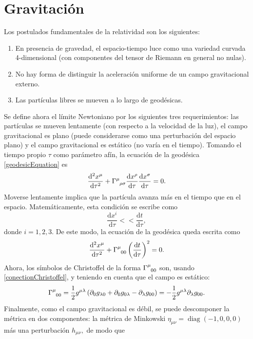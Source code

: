 \section{Gravitación}
Los postulados fundamentales de la relatividad son los siguientes:
	\begin{enumerate}
		\item En presencia de gravedad, el espacio-tiempo luce como una variedad curvada 4-dimensional (con componentes del tensor de Riemann en general no nulas).
		\item No hay forma de distinguir la aceleración uniforme de un campo gravitacional externo.
		\item Las partículas libres se mueven a lo largo de geodésicas.
	\end{enumerate}  
Se define ahora el límite Newtoniano por los siguientes tres requerimientos: las partículas se mueven lentamente (con respecto a la velocidad de la luz), el campo gravitacional es plano (puede considerarse como una perturbación del espacio plano) y el campo gravitacional es estático (no varía en el tiempo). Tomando el tiempo propio $\tau$ como parámetro afín, la ecuación de la geodésica \eqref{geodesicEquation} es
\begin{equation}
\frac{\mathrm{d}^2x^\mu}{\mathrm{d}\tau^2}+\Gamma\indices{^\mu_{\rho\sigma}}\frac{\mathrm{d}x^\rho}{\mathrm{d}\tau}\frac{\mathrm{d}x^\sigma}{\mathrm{d}\tau}=0.
\end{equation}
Moverse lentamente implica que la partícula avanza más en el tiempo que en el espacio. Matemáticamente, esta condición se escribe como
\begin{equation}
	\frac{\mathrm{d} x^{i}}{\mathrm{d}\tau}<<\frac{\mathrm{d} t}{\mathrm{d}\tau},
\end{equation}
donde $i=1,2,3.$ De este modo, la ecuación de la geodésica queda escrita como
\begin{equation}\label{geodesicNewtonian}
\frac{\mathrm{d}^2x^\mu}{\mathrm{d}\tau^2}+\Gamma\indices{^\mu_{00}}\left(\frac{\mathrm{d}t}{\mathrm{d}\tau}\right)^2=0.
\end{equation}
Ahora, los símbolos de Christoffel de la forma $\Gamma\indices{^\mu_{00}}$ son, usando \eqref{conectionChristoffel}, y teniendo en cuenta que el campo es estático:
$$\Gamma\indices{^\mu_{00}}=\frac{1}{2}g^{\mu\lambda}\left( \partial_0 g_{\lambda0}+\partial_0 g_{0\lambda}-\partial_\lambda g_{00}\right)=-\frac{1}{2}g^{\mu\lambda}\partial_\lambda g_{00}.$$
Finalmente, como el campo gravitacional es débil, se puede descomponer la métrica en dos componentes: la métrica de Minkowski $\eta_{\mu\nu}=\mathop{diag}(-1,0,0,0)$ más una perturbación $h_{\mu\nu},$ de modo que
